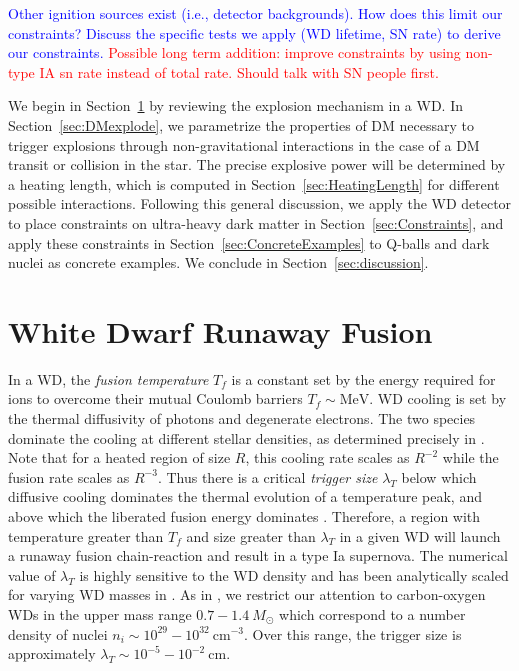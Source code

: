 \documentclass[twocolumn,showpacs,preprintnumbers,amsmath,amssymb,prd]{revtex4}
\newcommand{\MeV}{\text{MeV}}
\newcommand{\cm}{\text{cm}}
\begin{document}
\textcolor{blue}{Other ignition sources exist (i.e., detector backgrounds). How does this limit our constraints? Discuss the specific tests we apply (WD lifetime, SN rate) to derive our constraints.} \textcolor{red}{Possible long term addition: improve constraints by using non-type IA sn rate instead of total rate. Should talk with SN people first.}

We begin in Section~\ref{sec:Review} by reviewing the explosion mechanism in a WD. In Section~\ref{sec:DMexplode}, we parametrize the properties of DM necessary to trigger explosions through non-gravitational interactions in the case of a DM transit or collision in the star. The precise explosive power will be determined by a heating length, which is computed in Section~\ref{sec:HeatingLength} for different possible interactions. Following this general discussion, we apply the WD detector to place constraints on ultra-heavy dark matter in Section~\ref{sec:Constraints}, and apply these constraints in Section~\ref{sec:ConcreteExamples} to Q-balls and dark nuclei as concrete examples. We conclude in Section~\ref{sec:discussion}.

\section{White Dwarf Runaway Fusion}
\label{sec:Review}
In a WD, the \emph{fusion temperature} $T_f$ is a constant set by the energy required for ions to overcome their mutual Coulomb barriers $T_f \sim \MeV$. WD cooling is set by the thermal diffusivity of photons and degenerate electrons. The two species dominate the cooling at different stellar densities, as determined precisely in \cite{Woosley}. Note that for a heated region of size $R$, this cooling rate scales as $R^{-2}$ while the fusion rate scales as $R^{-3}$. Thus there is a critical \emph{trigger size} $\lambda_T$ below which diffusive cooling dominates the thermal evolution of a temperature peak, and above which the liberated fusion energy dominates \cite{Woosley}. Therefore, a region with temperature greater than $T_f$ and size greater than $\lambda_T$ in a given WD will launch a runaway fusion chain-reaction and result in a type Ia supernova. The numerical value of $\lambda_T$ is highly sensitive to the WD density and has been analytically scaled for varying WD masses in \cite{Graham:2015apa}. As in \cite{Graham:2015apa}, we restrict our attention to carbon-oxygen WDs in the upper mass range $0.7 - 1.4 ~M_{\odot}$ which correspond to a number density of nuclei $n_i \sim 10^{29} - 10^{32} ~\cm^{-3}$. Over this range, the trigger size is approximately $\lambda_T \sim 10^{-5} - 10^{-2} ~\text{cm}$.
\end{document}
